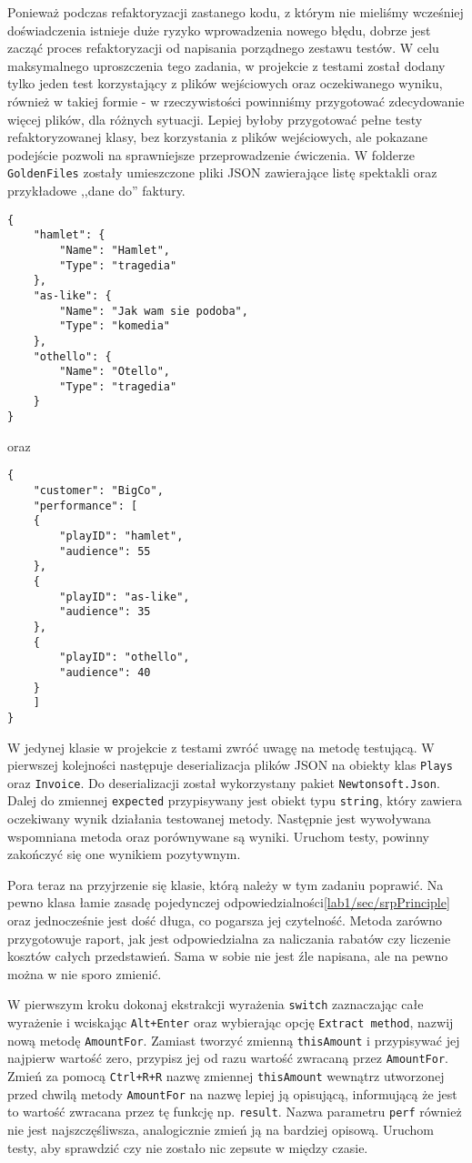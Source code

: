 Ponieważ podczas refaktoryzacji zastanego kodu, z którym nie mieliśmy wcześniej doświadczenia istnieje duże ryzyko wprowadzenia nowego błędu, dobrze jest zacząć proces refaktoryzacji od napisania porządnego zestawu testów. W celu maksymalnego uproszczenia tego zadania, w projekcie z testami został dodany tylko jeden test korzystający z plików wejściowych oraz oczekiwanego wyniku, również w takiej formie - w rzeczywistości powinniśmy przygotować zdecydowanie więcej plików, dla różnych sytuacji. Lepiej byłoby przygotować pełne testy refaktoryzowanej klasy, bez korzystania z plików wejściowych, ale pokazane podejście pozwoli na sprawniejsze przeprowadzenie ćwiczenia. W folderze \texttt{GoldenFiles} zostały umieszczone pliki JSON zawierające listę spektakli oraz przykładowe ,,dane do'' faktury.
\begin{lstlisting}[caption={plays.json}]
{
	"hamlet": {
		"Name": "Hamlet",
		"Type": "tragedia"
	},
	"as-like": {
		"Name": "Jak wam sie podoba",
		"Type": "komedia"
	},
	"othello": {
		"Name": "Otello",
		"Type": "tragedia"
	}
}
\end{lstlisting}
oraz
\begin{lstlisting}[caption={invoices.json}]
{
	"customer": "BigCo",
	"performance": [
	{
		"playID": "hamlet",
		"audience": 55
	},
	{
		"playID": "as-like",
		"audience": 35
	},
	{
		"playID": "othello",
		"audience": 40
	}
	]
}
\end{lstlisting}

W jedynej klasie w projekcie z testami zwróć uwagę na metodę testującą. W pierwszej kolejności następuje deserializacja plików JSON na obiekty klas \texttt{Plays} oraz \texttt{Invoice}. Do deserializacji został wykorzystany pakiet \texttt{Newtonsoft.Json}. Dalej do zmiennej \texttt{expected} przypisywany jest obiekt typu \texttt{string}, który zawiera oczekiwany wynik działania testowanej metody. Następnie jest wywoływana wspomniana metoda oraz porównywane są wyniki. Uruchom testy, powinny zakończyć się one wynikiem pozytywnym.

Pora teraz na przyjrzenie się klasie, którą należy w tym zadaniu poprawić. Na pewno klasa łamie zasadę pojedynczej odpowiedzialności\ref{lab1/sec/srpPrinciple} oraz jednocześnie jest dość długa, co pogarsza jej czytelność. Metoda zarówno przygotowuje raport, jak jest odpowiedzialna za naliczania rabatów czy liczenie kosztów całych przedstawień. Sama w sobie nie jest źle napisana, ale na pewno można w nie sporo zmienić.

W pierwszym kroku dokonaj ekstrakcji wyrażenia \texttt{switch} zaznaczając całe wyrażenie i wciskając \texttt{Alt+Enter} oraz wybierając opcję \texttt{Extract method}, nazwij nową metodę \texttt{AmountFor}. Zamiast tworzyć zmienną \texttt{thisAmount} i przypisywać jej najpierw wartość zero, przypisz jej od razu wartość zwracaną przez \texttt{AmountFor}. Zmień za pomocą \texttt{Ctrl+R+R} nazwę zmiennej \texttt{thisAmount} wewnątrz utworzonej przed chwilą metody \texttt{AmountFor} na nazwę lepiej ją opisującą, informującą że jest to wartość zwracana przez tę funkcję np. \texttt{result}. Nazwa parametru \texttt{perf} również nie jest najszczęśliwsza, analogicznie zmień ją na bardziej opisową. Uruchom testy, aby sprawdzić czy nie zostało nic zepsute w między czasie.

